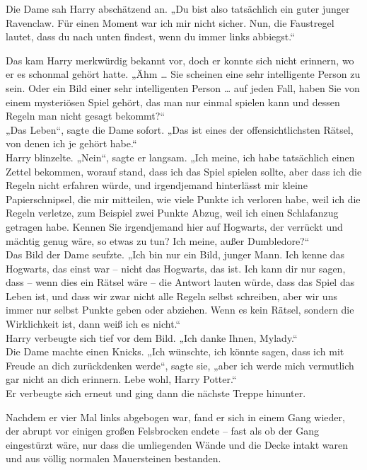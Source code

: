 {Die Dame sah Harry abschätzend an. „Du bist also tatsächlich ein guter junger Ravenclaw. Für einen Moment war ich mir nicht sicher. Nun, die Faustregel lautet, dass du nach unten findest, wenn du immer links abbiegst.“

Das kam Harry merkwürdig bekannt vor, doch er konnte sich nicht erinnern, wo er es schonmal gehört hatte. „Ähm … Sie scheinen eine sehr intelligente Person zu sein. Oder ein Bild einer sehr intelligenten Person … auf jeden Fall, haben Sie von einem mysteriösen Spiel gehört, das man nur einmal spielen kann und dessen Regeln man nicht gesagt bekommt?“\\ „Das Leben“, sagte die Dame sofort. „Das ist eines der offensichtlichsten Rätsel, von denen ich je gehört habe.“\\ Harry blinzelte. „Nein“, sagte er langsam. „Ich meine, ich habe tatsächlich einen Zettel bekommen, worauf stand, dass ich das Spiel spielen sollte, aber dass ich die Regeln nicht erfahren würde, und irgendjemand hinterlässt mir kleine Papierschnipsel, die mir mitteilen, wie viele Punkte ich verloren habe, weil ich die Regeln verletze, zum Beispiel zwei Punkte Abzug, weil ich einen Schlafanzug getragen habe. Kennen Sie irgendjemand hier auf Hogwarts, der verrückt und mächtig genug wäre, so etwas zu tun? Ich meine, außer Dumbledore?“\\ Das Bild der Dame seufzte. „Ich bin nur ein Bild, junger Mann. Ich kenne das Hogwarts, das einst war -- nicht das Hogwarts, das ist. Ich kann dir nur sagen, dass -- wenn dies ein Rätsel wäre -- die Antwort lauten würde, dass das Spiel das Leben ist, und dass wir zwar nicht alle Regeln selbst schreiben, aber wir uns immer nur selbst Punkte geben oder abziehen. Wenn es kein Rätsel, sondern die Wirklichkeit ist, dann weiß ich es nicht.“\\ Harry verbeugte sich tief vor dem Bild. „Ich danke Ihnen, Mylady.“\\ Die Dame machte einen Knicks. „Ich wünschte, ich könnte sagen, dass ich mit Freude an dich zurückdenken werde“, sagte sie, „aber ich werde mich vermutlich gar nicht an dich erinnern. Lebe wohl, Harry Potter.“\\ Er verbeugte sich erneut und ging dann die nächste Treppe hinunter.

Nachdem er vier Mal links abgebogen war, fand er sich in einem Gang wieder, der abrupt vor einigen großen Felsbrocken endete -- fast als ob der Gang eingestürzt wäre, nur dass die umliegenden Wände und die Decke intakt waren und aus völlig normalen Mauersteinen bestanden.

}
